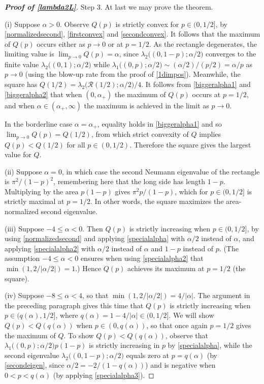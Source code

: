 \documentclass[12pt,reqno]{amsart}
\theoremstyle{definition}
\begin{document}
\begin{proof}[\bf Proof of \autoref{lambda2L}]
\smallskip
Step 3. At last we may prove the theorem. 

\smallskip
(i) Suppose $\alpha>0$. Observe $Q(p)$ is strictly convex for $p \in (0,1/2]$, by \eqref{normalizedsecond}, \eqref{firstconvex} and \eqref{secondconvex}. It follows that the maximum of $Q(p)$ occurs either as $p \to 0$ or at $p=1/2$. As the rectangle degenerates, the limiting value is $\lim_{p \to 0} Q(p) = \alpha$, since $\lambda_2\big( (0,1-p); \alpha/2\big)$ converges to the finite value $\lambda_2\big( (0,1); \alpha/2\big)$ while $\lambda_1\big( (0,p); \alpha/2\big) \sim (\alpha/2)/(p/2)=\alpha/p$ as $p \to 0$ (using the blow-up rate from the proof of \autoref{1dimpos}). Meanwhile, the square has $Q(1/2) = \lambda_2\big( \mathcal{R}(1/2);\alpha/2\big)/4$. It follows from \eqref{biggeralpha1} and \eqref{biggeralpha2} that when $(0,\alpha_+)$ the maximum of $Q(p)$ occurs at $p=1/2$, and when $\alpha \in (\alpha_+,\infty)$ the maximum is achieved in the limit as $p \to 0$. 

In the borderline case $\alpha=\alpha_+$, equality holds in \eqref{biggeralpha1} and so $\lim_{p \to 0} Q(p) = Q(1/2)$, from which strict convexity of $Q$ implies $Q(p) < Q(1/2)$ for all $p \in (0,1/2)$. Therefore the square gives the largest value for $Q$. 

\smallskip
(ii) Suppose $\alpha=0$, in which case the second Neumann eigenvalue of the rectangle is $\pi^2/(1-p)^2$, remembering here that the long side has length $1-p$. Multiplying by the area $p(1-p)$ gives $\pi^2 p/(1-p)$, which for $p \in (0,1/2]$ is strictly maximal at $p=1/2$. In other words, the square maximizes the area-normalized second eigenvalue.  

\smallskip
(iii) Suppose $-4 \leq \alpha < 0$. Then $Q(p)$ is strictly increasing when $p \in (0,1/2]$, by using \eqref{normalizedsecond} and applying \eqref{specialalpha} with $\alpha/2$ instead of $\alpha$, and applying \eqref{specialalpha2} with $\alpha/2$ instead of $\alpha$ and $1-p$ instead of $p$. (The assumption $-4 \leq \alpha < 0$ ensures when using \eqref{specialalpha2} that $\min(1,2/|\alpha/2|)=1$.) Hence $Q(p)$ achieves its maximum at $p=1/2$ (the square). 

\smallskip
(iv) Suppose $-8 \leq \alpha < 4$, so that $\min(1,2/|\alpha/2|)=4/|\alpha|$. The argument in the preceding paragraph gives this time that $Q(p)$ is strictly increasing when $p \in (q(\alpha),1/2]$, where $q(\alpha)=1-4/|\alpha| \in (0,1/2]$. We will show $Q(p) < Q(q(\alpha))$ when $p \in (0,q(\alpha))$, so that once again $p=1/2$ gives the maximum of $Q$. To show $Q(p) < Q(q(\alpha))$, observe that $\lambda_1\big( (0,p); \alpha/2\big) p(1-p)$ is strictly increasing in $p$ by \eqref{specialalpha}, while the second eigenvalue $\lambda_2\big( (0,1-p); \alpha/2\big)$ equals zero at $p=q(\alpha)$ (by \autoref{secondeigen}, since $\alpha/2=-2/(1-q(\alpha))$) and is negative when $0 < p < q(\alpha)$ (by applying \eqref{specialalpha3}). 


\end{proof}
\end{document}

